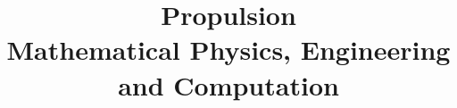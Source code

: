 
\title{Propulsion\\Mathematical Physics, Engineering and Computation}

\maketitle
\begin{notesbody}
\tableofcontents













\end{notesbody}



